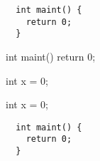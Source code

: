 \documentclass{article}
\begin{document}
\begin{verbatim}
  int maint() {
    return 0;
  }
\end{verbatim}

\begin{SomeVerbatimcode}
  int maint() {
    return 0;
  }
\end{SomeVerbatimcode}

\begin{code*}
  int x = 0;
\end{code*}

\begin{code}
  int x = 0;
\end{code}

\begin{verbatim}
  int maint() {
    return 0;
  }
\end{verbatim}
\end{document}
